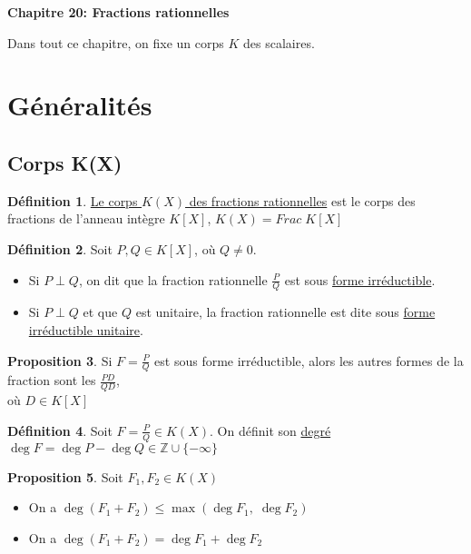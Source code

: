 \documentclass[10pt,a4paper]{article}
\theoremstyle{definition}
\newtheorem{proposition}{Proposition}[section]
\newtheorem{definition}[proposition]{Définition}
\begin{document}
\renewcommand{\labelitemi}{$*$}
\begin{center}
{\Large \textbf{Chapitre 20: Fractions rationnelles}}
\end{center}
Dans tout ce chapitre, on fixe un corps $K$ des scalaires.

\section{Généralités}
\subsection{Corps K(X)}
\begin{definition}
\uline{Le corps $K(X)$ des fractions rationnelles} est le corps des fractions de l'anneau intègre $K[X]$, $K(X) = Frac \; K[X]$
\end{definition}
\begin{definition}
Soit $P, Q \in K[X]$, où $Q \neq 0$.
\begin{itemize}
\item Si $P \perp Q$, on dit que la fraction rationnelle $\frac{P}{Q}$ est sous \uline{forme irréductible}.
\item Si $P \perp Q$ et que $Q$ est unitaire, la fraction rationnelle est dite sous \uline{forme irréductible unitaire}.
\end{itemize}
\end{definition}
\begin{proposition}
Si $F = \frac{P}{Q}$ est sous forme irréductible, alors les autres formes de la fraction sont les $\frac{PD}{QD}$, \\
où $D \in K[X]$
\end{proposition}
\begin{definition}
Soit $F = \frac{P}{Q} \in K(X)$. On définit son \uline{degré} $\deg{F} = \deg{P} - \deg{Q} \in \mathbb{Z} \cup \{-\infty\}$
\end{definition}
\begin{proposition}
Soit $F_1, F_2 \in K(X)$
\begin{itemize}
\item On a $\deg{(F_1 + F_2)} \leq \max{(\deg{F_1},\; \deg{F_2})}$
\item On a $\deg{(F_1 + F_2)} = \deg{F_1} + \deg{F_2}$
\end{itemize}
\end{proposition}
\end{document}
